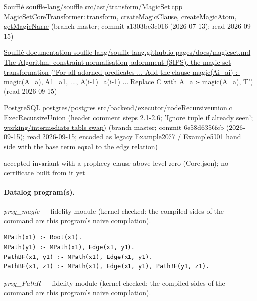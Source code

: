 \documentclass[10pt]{article}
\begin{document}
\begin{description}[leftmargin=2.6cm,style=nextline,itemsep=1pt]
\item[Sources] {\raggedright \href{https://github.com/souffle-lang/souffle/blob/master/src/ast/transform/MagicSet.cpp}{Soufflé souffle-lang/souffle src/ast/transform/MagicSet.cpp MagicSetCoreTransformer::transform, createMagicClause, createMagicAtom, getMagicName} (branch master; commit a1303be3c016 (2026-07-13); read 2026-09-15) \par \href{https://souffle-lang.github.io/magicset}{Soufflé documentation souffle-lang/souffle-lang.github.io pages/docs/magicset.md The Algorithm: constraint normalisation, adornment (SIPS), the magic set transformation ('For all adorned predicates ... Add the clause magic(Ai\_ai) :- magic(A\_a), A1\_a1, ..., A(i-1)\_a(i-1) ... Replace C with A\_a :- magic(A\_a), T')} (read 2026-09-15) \par \href{https://github.com/postgres/postgres/blob/master/src/backend/executor/nodeRecursiveunion.c}{PostgreSQL postgres/postgres src/backend/executor/nodeRecursiveunion.c ExecRecursiveUnion (header comment steps 2.1-2.6; 'Ignore tuple if already seen'; working/intermediate table swap)} (branch master; commit 6e58d6356fcb (2026-09-15); read 2026-09-15; encoded as legacy Example2037 / Example5001 hand side with the base term equal to the edge relation)\par}

\item[Prophecy] accepted invariant with a prophecy clause above level zero (Core.json); no certificate built from it yet.

\end{description}

\paragraph{Datalog program(s).}

{\raggedright\textit{prog\_magic} --- fidelity module (kernel-checked: the compiled sides of the command are this program's naive compilation).\par}

\begin{Verbatim}[fontsize=\scriptsize,breaklines=true,breakanywhere=true,frame=single,framesep=1.5mm]
MPath(x1) :- Root(x1).
MPath(y1) :- MPath(x1), Edge(x1, y1).
PathBF(x1, y1) :- MPath(x1), Edge(x1, y1).
PathBF(x1, z1) :- MPath(x1), Edge(x1, y1), PathBF(y1, z1).
\end{Verbatim}

{\raggedright\textit{prog\_PathR} --- fidelity module (kernel-checked: the compiled sides of the command are this program's naive compilation).\par}
\end{document}
